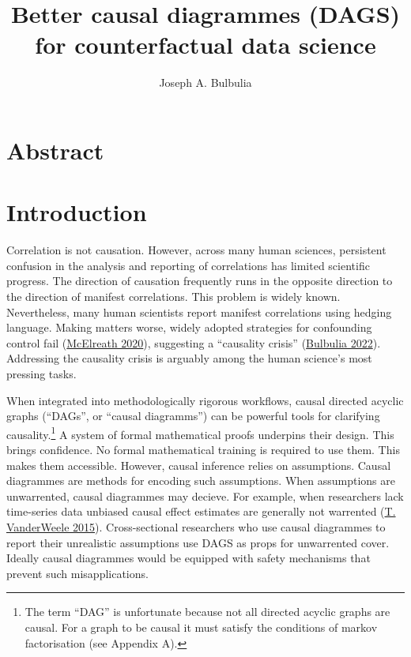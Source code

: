 \documentclass[
  singlecolumn]{report}
\title{Better causal diagrammes (DAGS) for counterfactual data science}
\author{Joseph A. Bulbulia}
\date{}
\begin{document}
\maketitle
\ifdefined\Shaded\renewenvironment{Shaded}{\begin{tcolorbox}[enhanced, boxrule=0pt, frame hidden, borderline west={3pt}{0pt}{shadecolor}, interior hidden, sharp corners, breakable]}{\end{tcolorbox}}\fi

\listoffigures
\listoftables
\hypertarget{abstract}{%
\section{Abstract}\label{abstract}}

\hypertarget{introduction}{%
\section{Introduction}\label{introduction}}

Correlation is not causation. However, across many human sciences,
persistent confusion in the analysis and reporting of correlations has
limited scientific progress. The direction of causation frequently runs
in the opposite direction to the direction of manifest correlations.
This problem is widely known. Nevertheless, many human scientists report
manifest correlations using hedging language. Making matters worse,
widely adopted strategies for confounding control fail
(\protect\hyperlink{ref-mcelreath2020}{McElreath 2020}), suggesting a
``causality crisis'' (\protect\hyperlink{ref-bulbulia2022}{Bulbulia
2022}). Addressing the causality crisis is arguably among the human
science's most pressing tasks.

When integrated into methodologically rigorous workflows, causal
directed acyclic graphs (``DAGs'', or ``causal diagramms'') can be
powerful tools for clarifying causality.\footnote{The term ``DAG'' is
  unfortunate because not all directed acyclic graphs are causal. For a
  graph to be causal it must satisfy the conditions of markov
  factorisation (see Appendix A).} A system of formal mathematical
proofs underpins their design. This brings confidence. No formal
mathematical training is required to use them. This makes them
accessible. However, causal inference relies on assumptions. Causal
diagrammes are methods for encoding such assumptions. When assumptions
are unwarrented, causal diagrammes may decieve. For example, when
researchers lack time-series data unbiased causal effect estimates are
generally not warrented (\protect\hyperlink{ref-vanderweele2015}{T.
VanderWeele 2015}). Cross-sectional researchers who use causal
diagrammes to report their unrealistic assumptions use DAGS as props for
unwarrented cover. Ideally causal diagrammes would be equipped with
safety mechanisms that prevent such misapplications.
\end{document}
